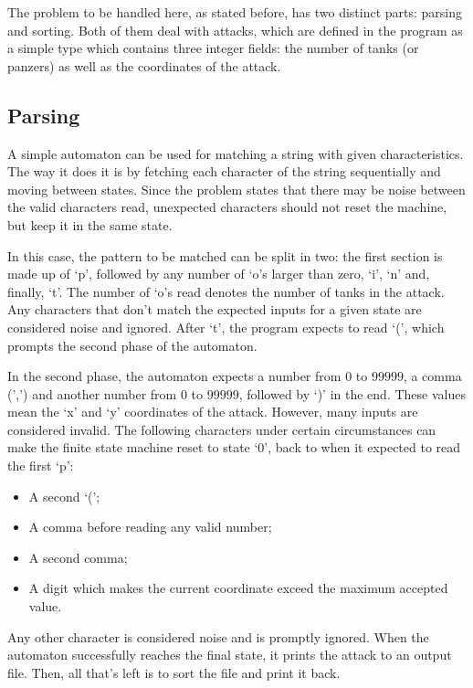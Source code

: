 \documentclass[10pt,a4paper]{article}
\begin{document}
The problem to be handled here, as stated before, has two distinct parts: parsing and sorting. Both of them deal with attacks, which are defined in the program as a simple type which contains three integer fields: the number of tanks (or panzers) as well as the coordinates of the attack.

\subsection*{Parsing}

A simple automaton can be used for matching a string with given characteristics. The way it does it is by fetching each character of the string sequentially and moving between states. Since the problem states that there may be noise between the valid characters read, unexpected characters should not reset the machine, but keep it in the same state.

In this case, the pattern to be matched can be split in two: the first section is made up of `p', followed by any number of `o's larger than zero, `i', `n' and, finally, `t'. The number of `o's read denotes the number of tanks in the attack. Any characters that don't match the expected inputs for a given state are considered noise and ignored. After `t', the program expects to read `(', which prompts the second phase of the automaton.

In the second phase, the automaton expects a number from $0$ to $99999$, a comma (',') and another number from $0$ to $99999$, followed by `)' in the end. These values mean the `x' and `y' coordinates of the attack. However, many inputs are considered invalid. The following characters under certain circumstances can make the finite state machine reset to state `0', back to when it expected to read the first `p':

\begin{itemize}
    \item A second `(';
    \item A comma before reading any valid number;
    \item A second comma;
    \item A digit which makes the current coordinate exceed the maximum accepted value.
\end{itemize}

Any other character is considered noise and is promptly ignored. When the automaton successfully reaches the final state, it prints the attack to an output file. Then, all that's left is to sort the file and print it back.
\end{document}
